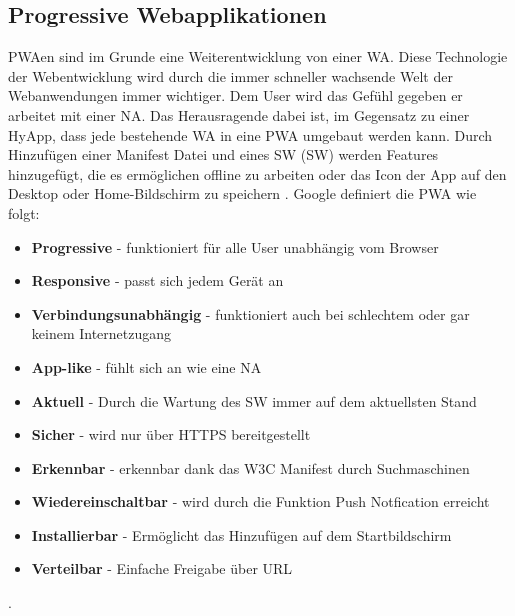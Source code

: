 \subsection{Progressive Webapplikationen}
\acl{PWA}en sind im Grunde eine Weiterentwicklung von einer \acs{WA}. Diese Technologie der Webentwicklung wird durch die immer schneller wachsende Welt der Webanwendungen immer wichtiger. 
Dem User wird das Gefühl gegeben er arbeitet mit einer \acs{NA}. Das Herausragende dabei ist, im Gegensatz zu einer \acs{HyApp}, dass jede bestehende \acs{WA} in eine \acs{PWA} umgebaut werden kann.
Durch Hinzufügen einer Manifest Datei und eines \acl{SW} (\acs{SW}) werden Features hinzugefügt, die es ermöglichen offline zu arbeiten oder das Icon der App auf den Desktop oder Home-Bildschirm zu speichern \cite{PWA}.
Google definiert die \acs{PWA} wie folgt:
\begin{itemize}
    \item  \textbf{Progressive} - funktioniert für alle User unabhängig vom Browser
	\item  \textbf{Responsive} - passt sich jedem Gerät an	
	\item  \textbf{Verbindungsunabhängig} - funktioniert auch bei schlechtem oder gar keinem Internetzugang
	\item  \textbf{App-like} - fühlt sich an wie eine \acs{NA}
	\item  \textbf{Aktuell} - Durch die Wartung des \acs{SW} immer auf dem aktuellsten Stand
	\item  \textbf{Sicher} - wird nur über HTTPS bereitgestellt
	\item  \textbf{Erkennbar} - erkennbar dank das W3C Manifest durch Suchmaschinen
	\item  \textbf{Wiedereinschaltbar} - wird durch die Funktion Push Notfication erreicht
	\item  \textbf{Installierbar} - Ermöglicht das Hinzufügen auf dem Startbildschirm
	\item  \textbf{Verteilbar } - Einfache Freigabe über URL \cite{PWAAdjectives}
\end{itemize}. 


